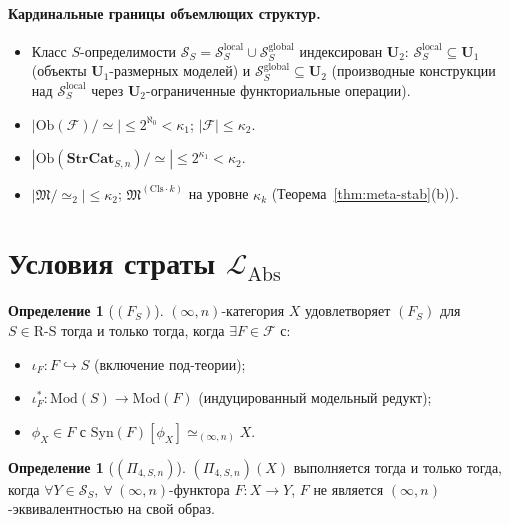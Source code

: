 \documentclass[11pt]{article}
\theoremstyle{plain}
\theoremstyle{definition}
\newtheorem{definition}[theorem]{Определение}
\newcommand{\RS}{\mathrm{R\text{-}S}}
\newcommand{\cS}{\mathcal{S}}
\newcommand{\cF}{\mathcal{F}}
\newcommand{\fM}{\mathfrak{M}}
\newcommand{\LAbs}{\mathcal{L}_{\mathrm{Abs}}}
\newcommand{\Ob}{\mathrm{Ob}}
\newcommand{\Syn}{\mathrm{Syn}}
\newcommand{\Mod}{\mathrm{Mod}}
\begin{document}
\paragraph{Кардинальные границы объемлющих структур.}
\begin{itemize}
\item Класс $S$-определимости $\cS_S = \cS_S^{\mathrm{local}} \cup \cS_S^{\mathrm{global}}$ индексирован $\mathbf{U}_2$: $\cS_S^{\mathrm{local}} \subseteq \mathbf{U}_1$ (объекты $\mathbf{U}_1$-размерных моделей) и $\cS_S^{\mathrm{global}} \subseteq \mathbf{U}_2$ (производные конструкции над $\cS_S^{\mathrm{local}}$ через $\mathbf{U}_2$-ограниченные функториальные операции).
\item $|\Ob(\cF)/\!\simeq| \leq 2^{\aleph_0} < \kappa_1$; $|\cF| \leq \kappa_2$.
\item $|\Ob(\mathbf{StrCat}_{S, n})/\!\simeq| \leq 2^{\kappa_1} < \kappa_2$.
\item $|\fM / \!\simeq_2| \leq \kappa_2$; $\fM^{(\mathrm{Cls}\cdot k)}$ на уровне $\kappa_k$ (Теорема~\ref{thm:meta-stab}(b)).
\end{itemize}

\section{\texorpdfstring{Условия страты $\LAbs$}{Условия страты L\_Abs}}\label{sec:conditions}

\begin{definition}[$(F_S)$]\label{def:F}
$(\infty, n)$-категория $X$ удовлетворяет $(F_S)$ для $S \in \RS$ тогда и только тогда, когда $\exists F \in \cF$ с:
\begin{itemize}
\item[\textbf{(F-1)}] $\iota_F : F \hookrightarrow S$ (включение под-теории);
\item[\textbf{(F-2)}] $\iota_F^* : \Mod(S) \to \Mod(F)$ (индуцированный модельный редукт);
\item[\textbf{(F-3)}] $\phi_X \in F$ с $\Syn(F)[\phi_X] \simeq_{(\infty, n)} X$.
\end{itemize}
\end{definition}

\begin{definition}[$(\Pi_{4, S, n})$]\label{def:pi4}
$(\Pi_{4, S, n})(X)$ выполняется тогда и только тогда, когда $\forall Y \in \cS_S,\ \forall\ (\infty, n)$-функтора $F : X \to Y$, $F$ не является $(\infty, n)$-эквивалентностью на свой образ.
\end{definition}
\end{document}
